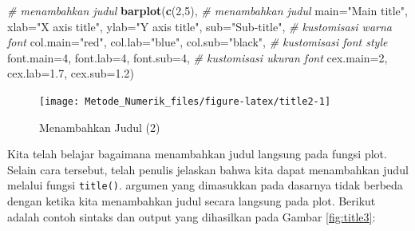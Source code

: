 \documentclass[]{book}
\newenvironment{Shaded}{\begin{snugshade}}{\end{snugshade}}
\newcommand{\CommentTok}[1]{\textcolor[rgb]{0.56,0.35,0.01}{\textit{#1}}}
\newcommand{\DataTypeTok}[1]{\textcolor[rgb]{0.13,0.29,0.53}{#1}}
\newcommand{\DecValTok}[1]{\textcolor[rgb]{0.00,0.00,0.81}{#1}}
\newcommand{\FloatTok}[1]{\textcolor[rgb]{0.00,0.00,0.81}{#1}}
\newcommand{\KeywordTok}[1]{\textcolor[rgb]{0.13,0.29,0.53}{\textbf{#1}}}
\newcommand{\NormalTok}[1]{#1}
\newcommand{\StringTok}[1]{\textcolor[rgb]{0.31,0.60,0.02}{#1}}
\theoremstyle{definition}
\theoremstyle{definition}
\theoremstyle{definition}
\theoremstyle{remark}
\begin{document}
\begin{Shaded}
\begin{Highlighting}[]
\CommentTok{# menambahkan judul}
\KeywordTok{barplot}\NormalTok{(}\KeywordTok{c}\NormalTok{(}\DecValTok{2}\NormalTok{,}\DecValTok{5}\NormalTok{), }
        \CommentTok{# menambahkan judul}
        \DataTypeTok{main=}\StringTok{"Main title"}\NormalTok{,}
        \DataTypeTok{xlab=}\StringTok{"X axis title"}\NormalTok{,}
        \DataTypeTok{ylab=}\StringTok{"Y axis title"}\NormalTok{,}
        \DataTypeTok{sub=}\StringTok{"Sub-title"}\NormalTok{,}
        \CommentTok{# kustomisasi warna font}
        \DataTypeTok{col.main=}\StringTok{"red"}\NormalTok{, }
        \DataTypeTok{col.lab=}\StringTok{"blue"}\NormalTok{, }
        \DataTypeTok{col.sub=}\StringTok{"black"}\NormalTok{,}
        \CommentTok{# kustomisasi font style}
        \DataTypeTok{font.main=}\DecValTok{4}\NormalTok{, }
        \DataTypeTok{font.lab=}\DecValTok{4}\NormalTok{, }
        \DataTypeTok{font.sub=}\DecValTok{4}\NormalTok{,}
        \CommentTok{# kustomisasi ukuran font}
        \DataTypeTok{cex.main=}\DecValTok{2}\NormalTok{, }
        \DataTypeTok{cex.lab=}\FloatTok{1.7}\NormalTok{, }
        \DataTypeTok{cex.sub=}\FloatTok{1.2}\NormalTok{)}
\end{Highlighting}
\end{Shaded}

\begin{figure}

{\centering \texttt{[image: Metode\_Numerik\_files/figure-latex/title2-1]} 

}

\caption{Menambahkan Judul (2)}\label{fig:title2}
\end{figure}

Kita telah belajar bagaimana menambahkan judul langsung pada fungsi plot. Selain cara tersebut, telah penulis jelaskan bahwa kita dapat menambahkan judul melalui fungsi \texttt{title()}. argumen yang dimasukkan pada dasarnya tidak berbeda dengan ketika kita menambahkan judul secara langsung pada plot. Berikut adalah contoh sintaks dan output yang dihasilkan pada Gambar \ref{fig:title3}:
\end{document}

